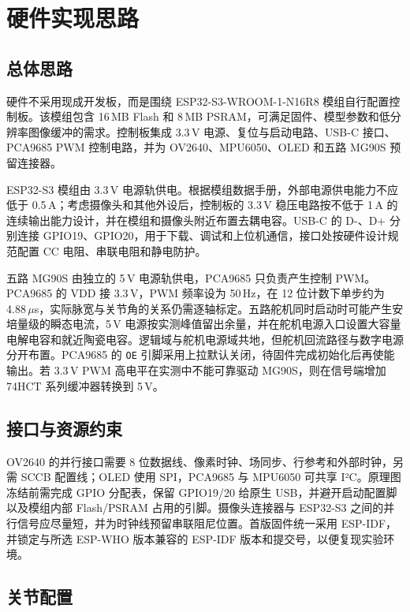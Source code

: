 \section{硬件实现思路}

\subsection{总体思路}

硬件不采用现成开发板，而是围绕 ESP32-S3-WROOM-1-N16R8 模组自行配置控制板。该模组包含 16\,MB Flash 和 8\,MB PSRAM，可满足固件、模型参数和低分辨率图像缓冲的需求。控制板集成 3.3\,V 电源、复位与启动电路、USB-C 接口、PCA9685 PWM 控制电路，并为 OV2640、MPU6050、OLED 和五路 MG90S 预留连接器。

ESP32-S3 模组由 3.3\,V 电源轨供电。根据模组数据手册，外部电源供电能力不应低于 0.5\,A；考虑摄像头和其他外设后，控制板的 3.3\,V 稳压电路按不低于 1\,A 的连续输出能力设计，并在模组和摄像头附近布置去耦电容。USB-C 的 D-、D+ 分别连接 GPIO19、GPIO20，用于下载、调试和上位机通信，接口处按硬件设计规范配置 CC 电阻、串联电阻和静电防护。

五路 MG90S 由独立的 5\,V 电源轨供电，PCA9685 只负责产生控制 PWM。PCA9685 的 VDD 接 3.3\,V，PWM 频率设为 50\,Hz，在 12 位计数下单步约为 4.88\,$\mu$s，实际脉宽与关节角的关系仍需逐轴标定。五路舵机同时启动时可能产生安培量级的瞬态电流，5\,V 电源按实测峰值留出余量，并在舵机电源入口设置大容量电解电容和就近陶瓷电容。逻辑域与舵机电源域共地，但舵机回流路径与数字电源分开布置。PCA9685 的 \texttt{OE} 引脚采用上拉默认关闭，待固件完成初始化后再使能输出。若 3.3\,V PWM 高电平在实测中不能可靠驱动 MG90S，则在信号端增加 74HCT 系列缓冲器转换到 5\,V。

\subsection{接口与资源约束}

OV2640 的并行接口需要 8 位数据线、像素时钟、场同步、行参考和外部时钟，另需 SCCB 配置线；OLED 使用 SPI，PCA9685 与 MPU6050 可共享 I²C。原理图冻结前需完成 GPIO 分配表，保留 GPIO19/20 给原生 USB，并避开启动配置脚以及模组内部 Flash/PSRAM 占用的引脚。摄像头连接器与 ESP32-S3 之间的并行信号应尽量短，并为时钟线预留串联阻尼位置。首版固件统一采用 ESP-IDF，并锁定与所选 ESP-WHO 版本兼容的 ESP-IDF 版本和提交号，以便复现实验环境。

\subsection{关节配置}

